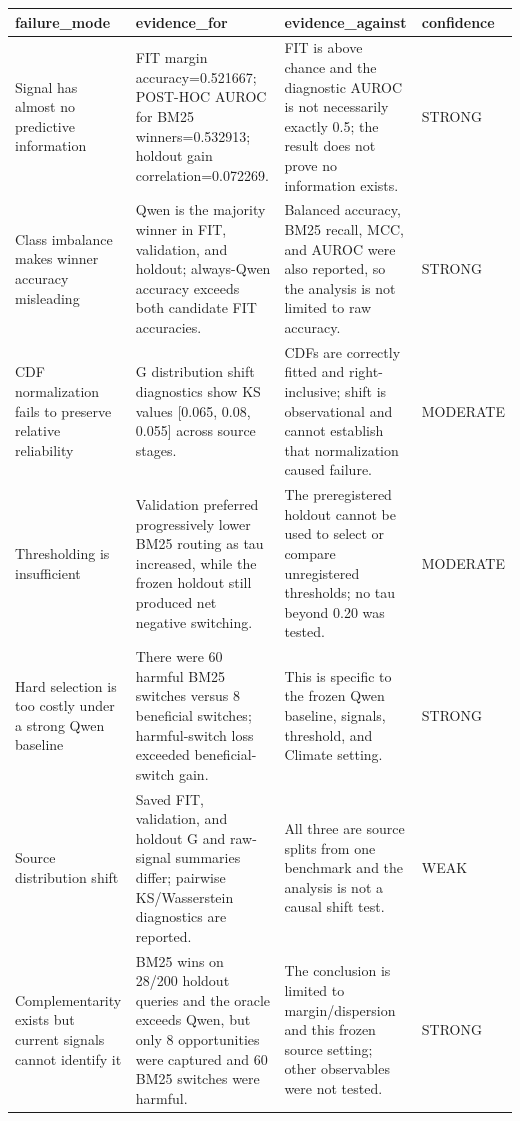 \begin{tabular}{llll}
\toprule
failure\_mode & evidence\_for & evidence\_against & confidence \\
\midrule
Signal has almost no predictive information & FIT margin accuracy=0.521667; POST-HOC AUROC for BM25 winners=0.532913; holdout gain correlation=0.072269. & FIT is above chance and the diagnostic AUROC is not necessarily exactly 0.5; the result does not prove no information exists. & STRONG \\
Class imbalance makes winner accuracy misleading & Qwen is the majority winner in FIT, validation, and holdout; always-Qwen accuracy exceeds both candidate FIT accuracies. & Balanced accuracy, BM25 recall, MCC, and AUROC were also reported, so the analysis is not limited to raw accuracy. & STRONG \\
CDF normalization fails to preserve relative reliability & G distribution shift diagnostics show KS values [0.065, 0.08, 0.055] across source stages. & CDFs are correctly fitted and right-inclusive; shift is observational and cannot establish that normalization caused failure. & MODERATE \\
Thresholding is insufficient & Validation preferred progressively lower BM25 routing as tau increased, while the frozen holdout still produced net negative switching. & The preregistered holdout cannot be used to select or compare unregistered thresholds; no tau beyond 0.20 was tested. & MODERATE \\
Hard selection is too costly under a strong Qwen baseline & There were 60 harmful BM25 switches versus 8 beneficial switches; harmful-switch loss exceeded beneficial-switch gain. & This is specific to the frozen Qwen baseline, signals, threshold, and Climate setting. & STRONG \\
Source distribution shift & Saved FIT, validation, and holdout G and raw-signal summaries differ; pairwise KS/Wasserstein diagnostics are reported. & All three are source splits from one benchmark and the analysis is not a causal shift test. & WEAK \\
Complementarity exists but current signals cannot identify it & BM25 wins on 28/200 holdout queries and the oracle exceeds Qwen, but only 8 opportunities were captured and 60 BM25 switches were harmful. & The conclusion is limited to margin/dispersion and this frozen source setting; other observables were not tested. & STRONG \\
\bottomrule
\end{tabular}
